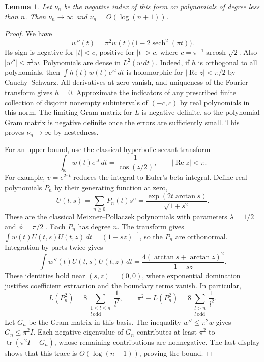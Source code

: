 \documentclass[11pt,a4paper]{article}
\newtheorem{lemma}[theorem]{Lemma}
\theoremstyle{definition}
\theoremstyle{remark}
\numberwithin{equation}{section}
\begin{document}
\begin{lemma}\label{brsign:inertia}
Let $\nu_n$ be the negative index of this form on polynomials of degree
less than $n$. Then $\nu_n\to\infty$ and $\nu_n=O(\log(n+1))$.
\end{lemma}
\begin{proof}
We have
\[
   w''(t)=\pi^2w(t)\bigl(1-2\operatorname{sech}^2(\pi t)\bigr).
\]
Its sign is negative for $|t|<c$, positive for $|t|>c$, where
$c=\pi^{-1}\operatorname{arcosh}\sqrt2$. Also $|w''|\le\pi^2w$.
Polynomials are dense in $L^2(w\,dt)$. Indeed, if $h$ is orthogonal to
all polynomials, then $\int h(t)w(t)e^{zt}\,dt$ is holomorphic for
$|\operatorname{Re}z|<\pi/2$ by Cauchy--Schwarz. All derivatives at zero
vanish, and uniqueness of the Fourier transform gives $h=0$.
Approximate the indicators of any prescribed finite collection of disjoint
nonempty subintervals of $(-c,c)$ by real polynomials in this norm.
The limiting Gram matrix for $L$ is negative definite, so the polynomial
Gram matrix is negative definite once the errors are sufficiently small.
This proves $\nu_n\to\infty$ by nestedness.

For an upper bound, use the classical hyperbolic secant transform
\[
  \int_{\mathbb R} w(t)e^{zt}\,dt=\frac1{\cos(z/2)},
  \qquad |\operatorname{Re}z|<\pi.
\]
For example, $v=e^{2\pi t}$ reduces the integral to Euler's beta integral.
Define real polynomials $P_n$ by their generating function at zero,
\[
  U(t,s)=\sum_{n\ge0}P_n(t)s^n
   =\frac{\exp(2t\arctan s)}{\sqrt{1+s^2}}.
\]
These are the classical Meixner--Pollaczek polynomials with parameters
$\lambda=1/2$ and $\phi=\pi/2$ \cite[Eq.~18.23.7]{DLMFMP}. Each $P_n$ has degree $n$. The transform gives
$\int w(t)U(t,s)U(t,z)\,dt=(1-sz)^{-1}$, so the $P_n$ are orthonormal.
Integration by parts twice gives
\[
  \int w''(t)U(t,s)U(t,z)\,dt
   =\frac{4(\arctan s+\arctan z)^2}{1-sz}.
\]
These identities hold near $(s,z)=(0,0)$, where exponential domination
justifies coefficient extraction and the boundary terms vanish.
In particular,
\[
 L(P_n^2)=8\sum_{\substack{1\le l\le n\\l\ \mathrm{odd}}}\frac1{l^2},
 \qquad \pi^2-L(P_n^2)=8\sum_{\substack{l>n\\l\ \mathrm{odd}}}\frac1{l^2}.
\]
Let $G_n$ be the Gram matrix in this basis. The inequality $w''\le\pi^2w$
gives $G_n\le\pi^2 I$. Each negative eigenvalue of $G_n$ contributes
at least $\pi^2$ to $\operatorname{tr}(\pi^2 I-G_n)$, whose remaining
contributions are nonnegative. The last display shows that this trace is
$O(\log(n+1))$, proving the bound.
\end{proof}
\end{document}

